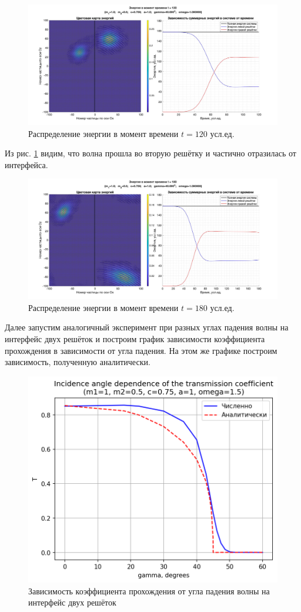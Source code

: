 \documentclass[main.tex]{subfiles}
\begin{document}
\begin{figure}[H] 
\center
\includegraphics[width=\linewidth]{tex/imgs/modelling-2.jpg}
\caption{Распределение энергии в момент времени $t=120$ усл.ед.}
\label{fig:modelling-2}  
\end{figure}

Из рис. \ref{fig:modelling-2} видим, что волна прошла во вторую решётку и частично отразилась от интерфейса.

\begin{figure}[H] 
\center
\includegraphics[width=\linewidth]{tex/imgs/modelling-3.jpg}
\caption{Распределение энергии в момент времени $t=180$ усл.ед.}
\label{fig:modelling-3}  
\end{figure}

Далее запустим аналогичный эксперимент при разных углах падения волны на интерфейс двух решёток и построим график зависимости коэффициента прохождения в зависимости от угла падения.
На этом же графике построим зависимость, полученную аналитически.

\begin{figure}[H] 
\center
\includegraphics[width=.6\linewidth]{tex/imgs/transmission-coefficient.png}
\caption{Зависимость коэффициента прохождения от угла падения волны на интерфейс двух решёток} 
\label{fig:transmission-coefficient}  
\end{figure}
\end{document}
